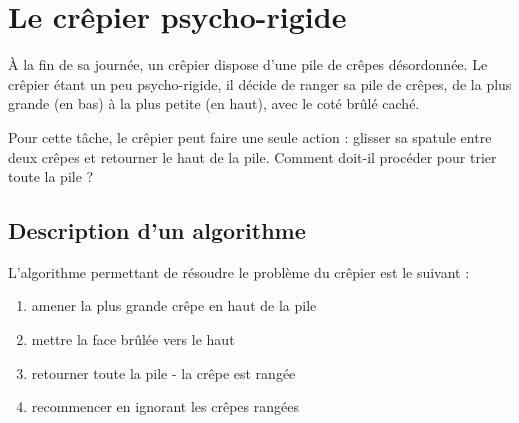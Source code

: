 \chapter*{Le crêpier psycho-rigide}

À la fin de sa journée, un crêpier dispose d'une pile de crêpes désordonnée. Le
crêpier étant un peu psycho-rigide, il décide de ranger sa pile de crêpes, de la
plus grande (en bas) à la plus petite (en haut), avec le coté brûlé caché.

\begin{center}
  
\end{center}

Pour cette tâche, le crêpier peut faire une seule action : glisser sa spatule
entre deux crêpes et retourner le haut de la pile. Comment doit-il procéder pour
trier toute la pile ?

\begin{center}
  
\end{center}



\newpage

\section*{Description d'un algorithme}

L'algorithme permettant de résoudre le problème du crêpier est le suivant :

\begin{enumerate}
\item amener la plus grande crêpe en haut de la pile
\item mettre la face brûlée vers le haut
\item retourner toute la pile - la crêpe est rangée
\item recommencer en ignorant les crêpes rangées
\end{enumerate}

